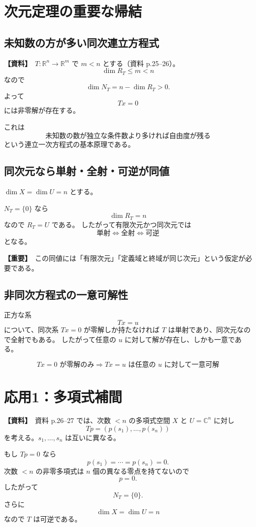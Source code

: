 \documentclass[a4paper,11pt]{ltjsarticle}
\newcommand{\R}{\mathbb{R}}
\newcommand{\C}{\mathbb{C}}
\newcommand{\sourceitem}{\textbf{【資料】}}
\newcommand{\highimportance}{\textbf{【重要】}}
\begin{document}
\section{次元定理の重要な帰結}

\subsection{未知数の方が多い同次連立方程式}
\sourceitem\ $T:\R^n\to\R^m$ で $m<n$ とする（資料 p.25--26）。
\[
\dim R_T\le m<n
\]
なので
\[
\dim N_T=n-\dim R_T>0.
\]
よって
\[
Tx=0
\]
には非零解が存在する。

これは
\[
\boxed{\text{未知数の数が独立な条件数より多ければ自由度が残る}}
\]
という連立一次方程式の基本原理である。

\subsection{同次元なら単射・全射・可逆が同値}
$\dim X=\dim U=n$ とする。

$N_T=\{0\}$ なら
\[
\dim R_T=n
\]
なので $R_T=U$ である。
したがって有限次元かつ同次元では
\[
\boxed{
\text{単射}\iff\text{全射}\iff\text{可逆}
}
\]
となる。

\highimportance\ この同値には「有限次元」「定義域と終域が同じ次元」という仮定が必要である。

\subsection{非同次方程式の一意可解性}
正方な系
\[
Tx=u
\]
について、同次系 $Tx=0$ が零解しか持たなければ $T$ は単射であり、同次元なので全射でもある。
したがって任意の $u$ に対して解が存在し、しかも一意である。

\[
\boxed{
Tx=0\text{ が零解のみ}
\Longrightarrow
Tx=u\text{ は任意の }u\text{ に対して一意可解}
}
\]

\section{応用1：多項式補間}

\sourceitem\ 資料 p.26--27 では、次数 $<n$ の多項式空間 $X$ と $U=\C^n$ に対し
\[
Tp=(p(s_1),\dots,p(s_n))
\]
を考える。$s_1,\dots,s_n$ は互いに異なる。

もし $Tp=0$ なら
\[
p(s_1)=\cdots=p(s_n)=0.
\]
次数 $<n$ の非零多項式は $n$ 個の異なる零点を持てないので
\[
p=0.
\]
したがって
\[
N_T=\{0\}.
\]
さらに
\[
\dim X=\dim U=n
\]
なので $T$ は可逆である。
\end{document}
